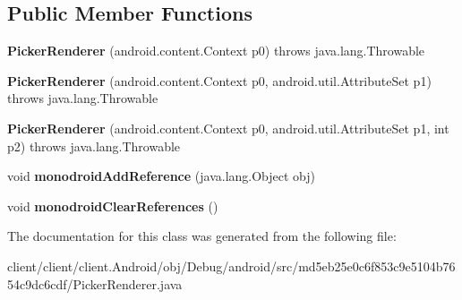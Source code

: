 \subsection*{Public Member Functions}
\begin{DoxyCompactItemize}
\item 
\hypertarget{classmd5eb25e0c6f853c9e5104b7654c9dc6cdf_1_1PickerRenderer_aae2c44525a32e5cbf2a99afd6d9abf27}{}{\bfseries Picker\+Renderer} (android.\+content.\+Context p0)  throws java.\+lang.\+Throwable 	\label{classmd5eb25e0c6f853c9e5104b7654c9dc6cdf_1_1PickerRenderer_aae2c44525a32e5cbf2a99afd6d9abf27}

\item 
\hypertarget{classmd5eb25e0c6f853c9e5104b7654c9dc6cdf_1_1PickerRenderer_a4ce8dff74ec928fe4c15e622b724f511}{}{\bfseries Picker\+Renderer} (android.\+content.\+Context p0, android.\+util.\+Attribute\+Set p1)  throws java.\+lang.\+Throwable 	\label{classmd5eb25e0c6f853c9e5104b7654c9dc6cdf_1_1PickerRenderer_a4ce8dff74ec928fe4c15e622b724f511}

\item 
\hypertarget{classmd5eb25e0c6f853c9e5104b7654c9dc6cdf_1_1PickerRenderer_ac200fe601a1bcddf8b4067aa703fbc30}{}{\bfseries Picker\+Renderer} (android.\+content.\+Context p0, android.\+util.\+Attribute\+Set p1, int p2)  throws java.\+lang.\+Throwable 	\label{classmd5eb25e0c6f853c9e5104b7654c9dc6cdf_1_1PickerRenderer_ac200fe601a1bcddf8b4067aa703fbc30}

\item 
\hypertarget{classmd5eb25e0c6f853c9e5104b7654c9dc6cdf_1_1PickerRenderer_a9725c7c65a5f5a47f43a794fcf37fea4}{}void {\bfseries monodroid\+Add\+Reference} (java.\+lang.\+Object obj)\label{classmd5eb25e0c6f853c9e5104b7654c9dc6cdf_1_1PickerRenderer_a9725c7c65a5f5a47f43a794fcf37fea4}

\item 
\hypertarget{classmd5eb25e0c6f853c9e5104b7654c9dc6cdf_1_1PickerRenderer_a1860034728b850a0f32e6ce135eee945}{}void {\bfseries monodroid\+Clear\+References} ()\label{classmd5eb25e0c6f853c9e5104b7654c9dc6cdf_1_1PickerRenderer_a1860034728b850a0f32e6ce135eee945}

\end{DoxyCompactItemize}


The documentation for this class was generated from the following file\+:\begin{DoxyCompactItemize}
\item 
client/client/client.\+Android/obj/\+Debug/android/src/md5eb25e0c6f853c9e5104b7654c9dc6cdf/Picker\+Renderer.\+java\end{DoxyCompactItemize}
